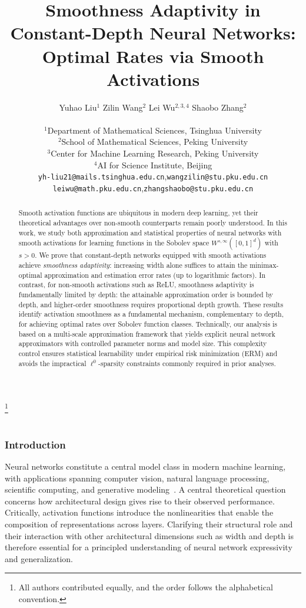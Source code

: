 \documentclass[11pt]{article}
\title{Smoothness Adaptivity in Constant-Depth Neural Networks: Optimal Rates via Smooth Activations}
\author{
    Yuhao Liu$^{1}$\quad
    Zilin Wang$^{2}$\quad
    Lei Wu$^{2,3,4}$\quad
    Shaobo Zhang$^{2}$
      \\
    \\
  $^1$Department of Mathematical Sciences, Tsinghua University
    \\
  $^2$School of Mathematical Sciences, Peking University 
    \\
  $^3$Center for Machine Learning Research, Peking University
  \\
  $^4$AI for Science Institute, Beijing\\[.5em]
  \texttt{yh-liu21@mails.tsinghua.edu.cn},\quad  \texttt{wangzilin@stu.pku.edu.cn}\\ 
  \texttt{leiwu@math.pku.edu.cn},\quad  \texttt{zhangshaobo@stu.pku.edu.cn}\\ 
}
\date{\vspace*{-2em}}
\newcommand{\blfootnote}[1]{%
  \begingroup
  \renewcommand\thefootnote{}%
  \footnote{#1}%
  \addtocounter{footnote}{-1}%
  \endgroup
}
\begin{document}
\maketitle
\blfootnote{All authors contributed equally, and the order follows the alphabetical convention.}

\begin{abstract}
Smooth activation functions are ubiquitous in modern deep learning, yet their theoretical advantages over non-smooth counterparts remain poorly understood. In this work, we study both approximation and statistical  properties of neural networks with smooth activations for learning functions in the Sobolev space $W^{s,\infty}([0,1]^d)$ with $s>0$.
We prove that constant-depth networks equipped with smooth activations achieve {\it smoothness adaptivity}: increasing width alone suffices to attain the minimax-optimal approximation  and estimation error rates (up to logarithmic factors).
In contrast, for non-smooth activations such as ReLU, smoothness adaptivity is fundamentally limited by depth: the attainable approximation order is bounded by depth, and higher-order smoothness requires proportional depth growth.
These results identify activation smoothness as a fundamental mechanism, complementary to depth, for achieving optimal rates over Sobolev function classes.
Technically, our analysis is based on a  multi-scale approximation framework that yields explicit neural network approximators with  controlled parameter norms and model size. This complexity control ensures statistical learnability under empirical risk minimization (ERM) and avoids the impractical $\ell^0$-sparsity constraints commonly required in prior analyses.
\end{abstract}


\doparttoc
\faketableofcontents
\part{}

\vspace*{-1.5em}
\section{Introduction}

Neural networks constitute a central model class in modern machine learning, with applications spanning computer vision, natural language processing, scientific computing, and generative modeling~\citep{krizhevsky2012imagenet,vaswani2017attention,raissi2019physics,radford2019language}. A central theoretical question concerns how architectural design gives rise to their observed performance. Critically, activation functions introduce the nonlinearities that enable  the composition of representations across  layers. Clarifying their structural role and their interaction with other architectural dimensions such as width and depth is therefore essential for a principled understanding of neural network expressivity and generalization.
\end{document}
